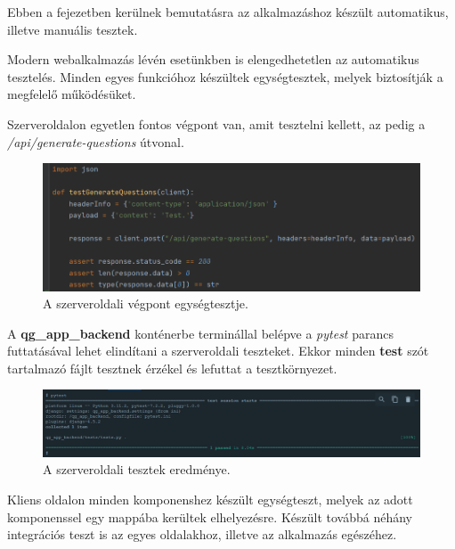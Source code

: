 
Ebben a fejezetben kerülnek bemutatásra az alkalmazáshoz készült automatikus, illetve manuális tesztek.


Modern webalkalmazás lévén esetünkben is elengedhetetlen az automatikus tesztelés. Minden egyes funkcióhoz készültek egységtesztek, melyek biztosítják a megfelelő működésüket.

Szerveroldalon egyetlen fontos végpont van, amit tesztelni kellett, az pedig a \\
\textit{/api/generate-questions} útvonal.

\begin{figure}[h]
\centering
\includegraphics[scale=0.6]{images/test_backend_1.png}
\caption{A szerveroldali végpont egységtesztje.}
\label{fig:tb1}
\end{figure}

A \textbf{qg\_app\_backend} konténerbe terminállal belépve a \textit{pytest} parancs futtatásával lehet elindítani a szerveroldali teszteket. Ekkor minden \textbf{test} szót tartalmazó fájlt tesztnek érzékel és lefuttat a tesztkörnyezet.

\begin{figure}[h]
\centering
\includegraphics[scale=0.5]{images/test_backend_2.png}
\caption{A szerveroldali tesztek eredménye.}
\label{fig:tb2}
\end{figure}

\pagebreak

Kliens oldalon minden komponenshez készült egységteszt, melyek az adott komponenssel egy mappába kerültek elhelyezésre. Készült továbbá néhány integrációs teszt is az egyes oldalakhoz, illetve az alkalmazás egészéhez.

